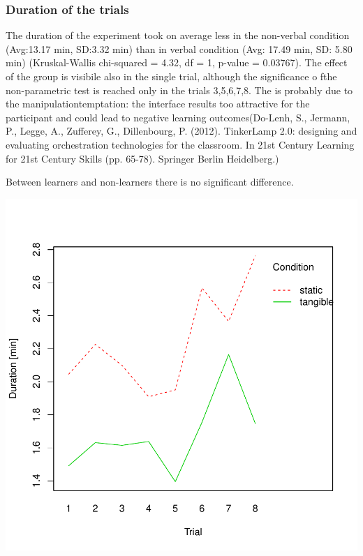 \documentclass{article}
\begin{document}


\subsubsection*{Duration of the trials}

The duration of the experiment took on average less in the non-verbal condition (Avg:13.17 min, SD:3.32 min) than in verbal condition (Avg: 17.49 min, SD: 5.80 min)  (Kruskal-Wallis chi-squared = 4.32, df = 1, p-value = 0.03767). The effect of the group is visibile also in the single trial, although the significance o fthe non-parametric test is reached only in the trials 3,5,6,7,8. The is probably due to the manipulationtemptation: the interface results too attractive for the participant and could lead to negative learning outcomes(Do-Lenh, S., Jermann, P., Legge, A., Zufferey, G.,  Dillenbourg, P. (2012). TinkerLamp 2.0: designing and evaluating orchestration technologies for the classroom. In 21st Century Learning for 21st Century Skills (pp. 65-78). Springer Berlin Heidelberg.) 

Between learners and non-learners there is no significant difference.   

\includegraphics{Report_Draft-002}
\end{document}
